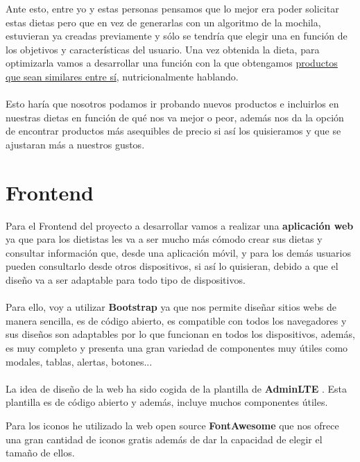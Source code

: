Ante esto, entre yo y estas personas pensamos que lo mejor era poder solicitar estas dietas pero que en vez de generarlas con un algoritmo de la mochila, estuvieran ya creadas previamente
y sólo se tendría que elegir una en función de los objetivos y características del usuario. Una vez obtenida la dieta, para optimizarla vamos a desarrollar una función con la que 
obtengamos \href{https://github.com/josemip98/TFG/issues/10}{productos que sean similares entre sí}, nutricionalmente hablando.\\\\

Esto haría que nosotros podamos ir probando nuevos productos e incluirlos en nuestras dietas en función de qué nos va mejor o peor, además nos da la opción de encontrar productos más asequibles de precio si así los quisieramos y que se ajustaran más a nuestros gustos.

\section{Frontend} \label{sec:frontend}

Para el Frontend del proyecto a desarrollar vamos a realizar una \textbf{aplicación web} ya que para los dietistas les va a ser mucho más cómodo
crear sus dietas y consultar información que, desde una aplicación móvil, y para los demás usuarios pueden consultarlo desde otros dispositivos, si así lo quisieran, 
debido a que el diseño va a ser adaptable para todo tipo de dispositivos.\\ \\

Para ello, voy a utilizar \textbf{Bootstrap} \cite{bootstrap} ya que nos permite diseñar sitios webs de manera sencilla,
es de código abierto, es compatible con todos los navegadores y sus diseños son adaptables por lo que funcionan en todos los dispositivos,
además, es muy completo y presenta una gran variedad de componentes muy útiles como modales, tablas, alertas, botones...\\ \\

La idea de diseño de la web ha sido cogida de la plantilla de \textbf{AdminLTE} \cite{adminlte}. Esta plantilla es de código abierto y 
además, incluye muchos componentes útiles.

Para los iconos he utilizado la web open source \textbf{FontAwesome} \cite{iconos} que nos 
ofrece una gran cantidad de iconos gratis además de dar la capacidad de elegir el tamaño de ellos.

